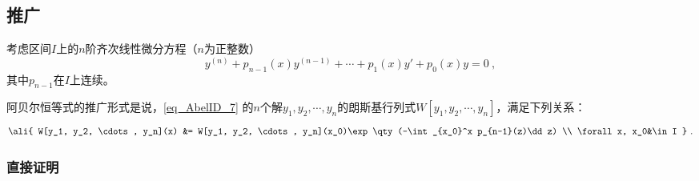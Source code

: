 \subsection{推广}

考虑区间$I$上的$n$阶齐次线性微分方程（$n$为正整数）
\begin{equation}\label{eq_AbelID_7}
y^{(n)} + p_{n-1}(x)y^{(n-1)} + \cdots + p_1(x)y' + p_0(x)y = 0~,
\end{equation}
其中$p_{n-1}$在$I$上连续。

阿贝尔恒等式的推广形式是说，\autoref{eq_AbelID_7} 的$n$个解$y_1, y_2, \cdots, y_n$的朗斯基行列式$W[y_1, y_2, \cdots, y_n]$，满足下列关系：
\begin{equation}
\ali{
W[y_1, y_2, \cdots, y_n](x) &= W[y_1, y_2, \cdots, y_n](x_0)\exp\qty(-\int_{x_0}^x p_{n-1}(z)\dd z) \\
\forall x, x_0&\in I
}~.
\end{equation}




\subsubsection{直接证明}

